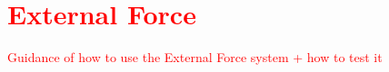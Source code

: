 \chapter{\textcolor{red}{External Force}}
\textcolor{red}{Guidance of how to use the External Force system + how to test it}